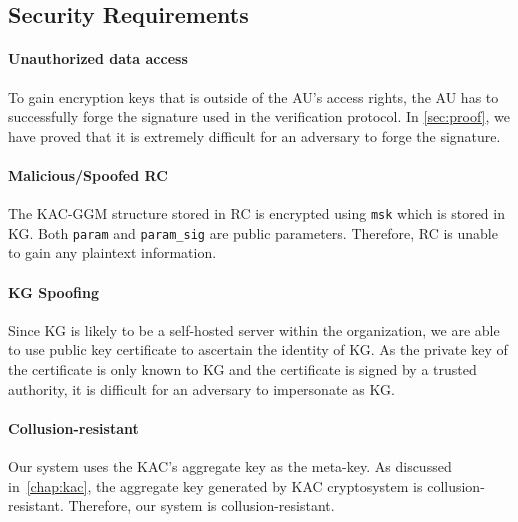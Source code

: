 \documentclass[hyp,a4paper,12pt,openbib]{socreport}
\begin{document}
\subsection{Security Requirements}

\paragraph{Unauthorized data access} To gain encryption keys that is outside of the AU's access rights, the AU has to successfully forge the signature used in the verification protocol. In \cref{sec:proof}, we have proved that it is extremely difficult for an adversary to forge the signature. 
\paragraph{Malicious/Spoofed RC} The KAC-GGM structure stored in RC is encrypted using \texttt{msk} which is stored in KG. Both \texttt{param} and \texttt{param\_sig} are public parameters. Therefore, RC is unable to gain any plaintext information.

\paragraph{KG Spoofing} Since KG is likely to be a self-hosted server within the organization, we are able to use public key certificate to ascertain the identity of KG. As the private key of the certificate is only known to KG and the certificate is signed by a trusted authority, it is difficult for an adversary to impersonate as KG.

\paragraph{Collusion-resistant} Our system uses the KAC's aggregate key as the meta-key. As discussed in~\cref{chap:kac}, the aggregate key generated by KAC cryptosystem is collusion-resistant. Therefore, our system is collusion-resistant.
\end{document}
